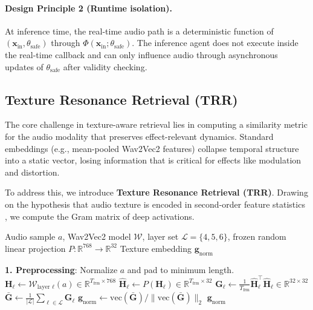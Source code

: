 		\paragraph{Design Principle 2 (Runtime isolation).}
		At inference time, the real-time audio path is a deterministic function of $(\mathbf{x}_{\text{in}},\theta_{\text{safe}})$ through $\Phi(\mathbf{x}_{\text{in}};\theta_{\text{safe}})$. The inference agent does not execute inside the real-time callback and can only influence audio through asynchronous updates of $\theta_{\text{safe}}$ after validity checking.

\subsection{Texture Resonance Retrieval (TRR)}
\label{ssec:rag}

The core challenge in texture-aware retrieval lies in computing a similarity metric for the audio modality that preserves effect-relevant dynamics. Standard embeddings (e.g., mean-pooled Wav2Vec2 features) collapse temporal structure into a static vector, losing information that is critical for effects like modulation and distortion.

To address this, we introduce \textbf{Texture Resonance Retrieval (TRR)}. Drawing on the hypothesis that audio texture is encoded in second-order feature statistics \citep{mcdermott2011sound}, we compute the Gram matrix of deep activations.

\begin{algorithm}[ht]
		\caption{TRR Encoding}
		\label{alg:trr_encoding}
		\begin{algorithmic}
			\REQUIRE Audio sample $a$, Wav2Vec2 model $\mathcal{W}$, layer set $\mathcal{L}=\{4,5,6\}$, frozen random linear projection $P:\mathbb{R}^{768}\rightarrow\mathbb{R}^{32}$
			\ENSURE Texture embedding $\mathbf{g}_{\text{norm}}$

			\STATE \textbf{1. Preprocessing}: Normalize $a$ and pad to minimum length.
			\STATE $\mathbf{H}_{\ell} \leftarrow \mathcal{W}_{\text{layer }\ell}(a) \in \mathbb{R}^{T_{\text{frm}} \times 768}$
			\STATE $\widehat{\mathbf{H}}_{\ell} \leftarrow P(\mathbf{H}_{\ell}) \in \mathbb{R}^{T_{\text{frm}} \times 32}$
			\STATE $\mathbf{G}_{\ell} \leftarrow \frac{1}{T_{\text{frm}}}\widehat{\mathbf{H}}_{\ell}^{\top}\widehat{\mathbf{H}}_{\ell} \in \mathbb{R}^{32 \times 32}$
			\ENDFOR
			\STATE $\bar{\mathbf{G}} \leftarrow \frac{1}{|\mathcal{L}|}\sum_{\ell\in\mathcal{L}}\mathbf{G}_{\ell}$
			\STATE $\mathbf{g}_{\text{norm}} \leftarrow \mathrm{vec}(\bar{\mathbf{G}}) / \|\mathrm{vec}(\bar{\mathbf{G}})\|_2$
		\RETURN $\mathbf{g}_{\text{norm}}$
	\end{algorithmic}
\end{algorithm}

